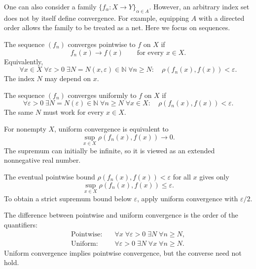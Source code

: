 \documentclass[answers,12pt,addpoints]{exam}
\begin{document}
\begin{remark}
One can also consider a family
$\{f_\alpha:X\to Y\}_{\alpha\in A}$.
However, an arbitrary index set does not by itself define
convergence. For example, equipping $A$ with a directed
order allows the family to be treated as a net.
Here we focus on sequences.
\end{remark}

\begin{definition}
The sequence $(f_n)$ converges pointwise to $f$ on $X$ if
\[
f_n(x)\to f(x)
\qquad\text{for every }x\in X.
\]
Equivalently,
\[
\forall x\in X\;
\forall\varepsilon>0\;
\exists N=N(x,\varepsilon)\in\mathbb{N}\;
\forall n\geq N:
\quad
\rho(f_n(x),f(x))<\varepsilon.
\]
The index $N$ may depend on $x$.
\end{definition}

\begin{definition}
The sequence $(f_n)$ converges uniformly to $f$ on $X$ if
\[
\forall\varepsilon>0\;
\exists N=N(\varepsilon)\in\mathbb{N}\;
\forall n\geq N\;
\forall x\in X:
\quad
\rho(f_n(x),f(x))<\varepsilon.
\]
The same $N$ must work for every $x\in X$.
\end{definition}

\begin{remark}
For nonempty $X$, uniform convergence is equivalent to
\[
\sup_{x\in X}\rho(f_n(x),f(x))\longrightarrow 0.
\]
The supremum can initially be infinite, so it is viewed
as an extended nonnegative real number.

The eventual pointwise bound
$\rho(f_n(x),f(x))<\varepsilon$ for all $x$ gives only
\[
\sup_{x\in X}\rho(f_n(x),f(x))\leq\varepsilon.
\]
To obtain a strict supremum bound below $\varepsilon$,
apply uniform convergence with $\varepsilon/2$.
\end{remark}

\begin{remark}
The difference between pointwise and uniform convergence
is the order of the quantifiers:
\[
\begin{aligned}
\text{Pointwise:}\quad&
\forall x\;\forall\varepsilon>0\;\exists N\;\forall n\geq N,\\
\text{Uniform:}\quad&
\forall\varepsilon>0\;\exists N\;\forall x\;\forall n\geq N.
\end{aligned}
\]
Uniform convergence implies pointwise convergence,
but the converse need not hold.
\end{remark}
\end{document}
